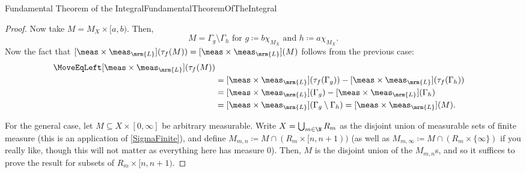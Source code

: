 \begin{thm}{Fundamental Theorem of the Integral}{FundamentalTheoremOfTheIntegral}
\begin{proof}
Now take $M=M_X\times [a,b)$.  Then,
\begin{equation}
M=\Gamma _g\setminus \Gamma _h\text{ for }g\coloneqq b\chi _{M_X}\text{ and }h\coloneqq a\chi _{M_X}.
\end{equation}
Now the fact that $[\meas \times \meas _{\mrm{L}}](\tau _f(M))=[\meas \times \meas _{\mrm{L}}](M)$ follows from the previous case:
\begin{equation}
\begin{split}
\MoveEqLeft \relax
[\meas \times \meas _{\mrm{L}}](\tau _f(M)) \\
& =[\meas \times \meas _{\mrm{L}}](\tau _f(\Gamma _g))-[\meas \times \meas _{\mrm{L}}](\tau _f(\Gamma _h)) \\
& =[\meas \times \meas _{\mrm{L}}](\Gamma _g)-[\meas \times \meas _{\mrm{L}}](\Gamma _h) \\
& =[\meas \times \meas _{\mrm{L}}](\Gamma _g\setminus \Gamma _h)=[\meas \times \meas _{\mrm{L}}](M).
\end{split}
\end{equation}

For the general case, let $M\subseteq X\times [0,\infty ]$ be arbitrary measurable.  Write $X=\bigcup _{m\in \N}R_m$ as the disjoint union of measurable sets of finite measure (this is an application of \cref{SigmaFinite}), and define $M_{m,n}\coloneqq M\cap (R_m\times [n,n+1))$ (as well as $M_{m,\infty}\coloneqq M\cap (R_m\times \{ \infty \} )$ if you really like, though this will not matter as everything here has measure $0$).  Then, $M$ is the disjoint union of the $M_{m,n}$s, and so it suffices to prove the result for subsets of $R_m\times [n,n+1)$.


\end{proof}
\end{thm}

